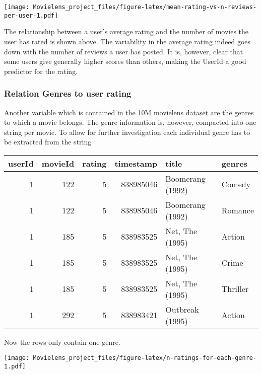 \documentclass[
]{article}
\newenvironment{Shaded}{\begin{snugshade}}{\end{snugshade}}
\newcommand{\CharTok}[1]{\textcolor[rgb]{0.31,0.60,0.02}{#1}}
\newcommand{\CommentTok}[1]{\textcolor[rgb]{0.56,0.35,0.01}{\textit{#1}}}
\newcommand{\DataTypeTok}[1]{\textcolor[rgb]{0.13,0.29,0.53}{#1}}
\newcommand{\KeywordTok}[1]{\textcolor[rgb]{0.13,0.29,0.53}{\textbf{#1}}}
\newcommand{\NormalTok}[1]{#1}
\newcommand{\OperatorTok}[1]{\textcolor[rgb]{0.81,0.36,0.00}{\textbf{#1}}}
\newcommand{\StringTok}[1]{\textcolor[rgb]{0.31,0.60,0.02}{#1}}
\begin{document}
\texttt{[image: Movielens\_project\_files/figure-latex/mean-rating-vs-n-reviews-per-user-1.pdf]}

The relationship between a user's average rating and the number of
movies the user has rated is shown above. The variability in the average
rating indeed goes down with the number of reviews a user has posted. It
is, however, clear that some users give generally higher scores than
others, making the UserId a good predictor for the rating.

\hypertarget{relation-genres-to-user-rating}{%
\subsubsection{Relation Genres to user
rating}\label{relation-genres-to-user-rating}}

Another variable which is contained in the 10M movielens dataset are the
genres to which a movie belongs. The genre information is, however,
compacted into one string per movie. To allow for further investigation
each individual genre has to be extracted from the string

\begin{Shaded}
\end{Shaded}

\begin{longtable}[]{@{}rrrrll@{}}
\toprule
userId & movieId & rating & timestamp & title & genres\tabularnewline
\midrule
\endhead
1 & 122 & 5 & 838985046 & Boomerang (1992) & Comedy\tabularnewline
1 & 122 & 5 & 838985046 & Boomerang (1992) & Romance\tabularnewline
1 & 185 & 5 & 838983525 & Net, The (1995) & Action\tabularnewline
1 & 185 & 5 & 838983525 & Net, The (1995) & Crime\tabularnewline
1 & 185 & 5 & 838983525 & Net, The (1995) & Thriller\tabularnewline
1 & 292 & 5 & 838983421 & Outbreak (1995) & Action\tabularnewline
\bottomrule
\end{longtable}

Now the rows only contain one genre.

\texttt{[image: Movielens\_project\_files/figure-latex/n-ratings-for-each-genre-1.pdf]}
\end{document}
